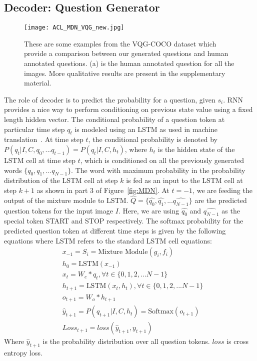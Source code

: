 \documentclass[11pt,a4paper]{article}
\begin{document}
\subsection{Decoder: Question Generator}
\begin{figure*}[ht]
\centering
	\texttt{[image: ACL\_MDN\_VQG\_new.jpg]}
	\vspace{-0.2cm}
	\caption{These are some examples from the VQG-COCO dataset which provide a comparison between our generated questions and human annotated questions. (a) is the human annotated question for all the images. More qualitative results are present in the supplementary material.}
	\label{fig:natural2}
\end{figure*}
\noindent The role of decoder is to predict the probability for a question, given $s_i$. RNN provides a nice way to perform conditioning on  previous state value using a fixed length hidden vector. 
The conditional probability of a question token at particular time step ${q_{t}}$ is modeled using an LSTM as used in machine translation~\cite{Sutskever_NIPS2014}. 
At time step $t$, the conditional probability is denoted by $P( {q_{t}} | {I ,C},{q_0},...{q_{t-1}})= P( {q_{t}} | {I ,C},h_{t})$, where $h_{t}$ is the hidden state of the LSTM cell at time step $t$, which is conditioned on all the previously generated words $\{{q_0},{q_1},...{q_{N-1}}\}$.
The word with maximum probability in the probability distribution of the LSTM cell at step $k$  is fed as an input to the LSTM cell at step $k+1$ as shown in part 3 of Figure~\ref{fig:MDN}. At $t=-1$, we are feeding the output of the mixture module to LSTM. $\hat{Q}=\{\hat{q_0},\hat{q_1},...\hat{q_{N-1}}\}$ are the predicted question tokens for the input image $I$. Here, we are using $\hat{q_0}$ and $\hat{q_{N-1}}$ as the special token START and STOP respectively. 
The softmax probability for the predicted question token at different time steps is given by the following equations where LSTM refers to the standard LSTM cell equations:
\begin{equation*}
 \begin{split}
& x_{-1}=S_i=\mbox{Mixture Module}(g_{i},f_{i}) \\
& h_0=\mbox{LSTM}(x_{-1})\\
& x_t=W_e*q_t,  \forall t\in \{0,1,2,...N-1\} \\
& {h_{t+1}}=\mbox{LSTM}(x_t,h_{t}), \forall t\in \{0,1,2,...N-1\}\\
& o_{t+1} = W_o * h_{t+1} \\
& \hat{y}_{t+1} = P( q_{t+1} | {I ,C},h_{t})= \mbox{Softmax}(o_{t+1})\\
& Loss_{t+1}=loss(\hat{y}_{t+1},y_{t+1})
 \end{split}
\end{equation*}
 Where  $\hat{y}_{t+1}$ is the probability distribution over all question tokens. $loss$ is cross entropy loss.
\end{document}
